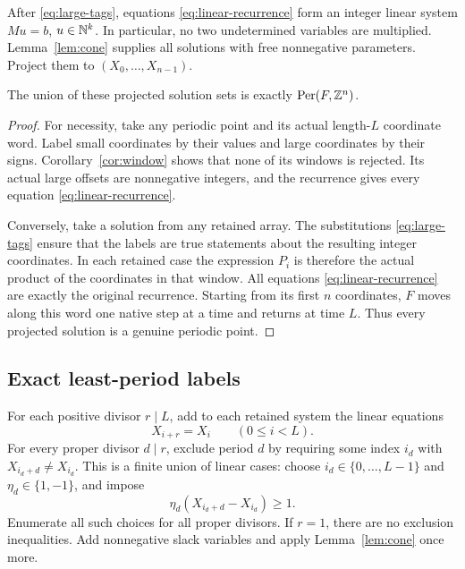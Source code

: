 After \eqref{eq:large-tags}, equations
\eqref{eq:linear-recurrence} form an integer linear system $Mu=b$,
$u\in\mathbb N^k$. In particular, no two undetermined variables are
multiplied. Lemma~\ref{lem:cone} supplies all solutions with free
nonnegative parameters. Project them to
$(X_0,\ldots,X_{n-1})$.

\begin{proposition}
\label{prop:tag-exact}
The union of these projected solution sets is exactly
$\operatorname{Per}(F,\mathbb Z^n)$.
\end{proposition}
\begin{proof}
For necessity, take any periodic point and its actual length-$L$
coordinate word. Label small coordinates by their values and large
coordinates by their signs. Corollary~\ref{cor:window} shows that
none of its windows is rejected. Its actual large offsets are
nonnegative integers, and the recurrence gives every equation
\eqref{eq:linear-recurrence}.

Conversely, take a solution from any retained array. The substitutions
\eqref{eq:large-tags} ensure that the labels are true statements about
the resulting integer coordinates. In each retained case the expression
$P_i$ is therefore the actual product of the coordinates in that window.
All equations \eqref{eq:linear-recurrence} are exactly the original
recurrence. Starting from its first $n$ coordinates, $F$ moves along
this word one native step at a time and returns at time $L$. Thus
every projected solution is a genuine periodic point.
\end{proof}

\subsection{Exact least-period labels}

For each positive divisor $r\mid L$, add to each retained system
the linear equations
\begin{equation}
 X_{i+r}=X_i\qquad(0\le i<L).
 \label{eq:r-periodic}
\end{equation}
For every proper divisor $d\mid r$, exclude period $d$ by requiring
some index $i_d$ with $X_{i_d+d}\ne X_{i_d}$. This is a finite
union of linear cases: choose $i_d\in\{0,\ldots,L-1\}$ and
$\eta_d\in\{1,-1\}$, and impose
\begin{equation}
 \eta_d(X_{i_d+d}-X_{i_d})\ge1.
 \label{eq:exclude-period}
\end{equation}
Enumerate all such choices for all proper divisors. If $r=1$,
there are no exclusion inequalities. Add nonnegative slack variables
and apply Lemma~\ref{lem:cone} once more.

